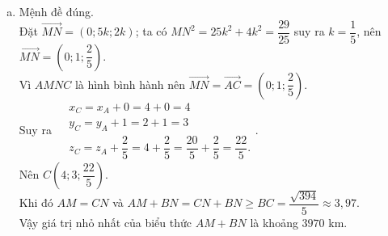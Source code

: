 \begin{ex}
{\begin{enumerate}[a)]
			Gọi $M$, $N$ là điểm đầu và điểm cuối của sao chổi trong vùng thượng quyển loãng  của sao Thủy.\\
			Ta có $IH=\dfrac{\sqrt{871}}{10}$, suy ra $MN=2MH=2\sqrt{R^2-IH^2}=2\sqrt{9-\dfrac{871}{100}}=\dfrac{\sqrt{29}}{5}$ (nghìn  km).\\
			Thời gian sao chổi di chuyển trong vùng thượng  quyển loãng
			\\$\dfrac{\sqrt{29}}{5} \times 1000\div51{,}5\approx 21$  (giây).
			 \item Mệnh đề đúng.\\
			Đặt $\overrightarrow{MN}=(0; 5k; 2k)$; ta có $MN^2=25k^2+4k^2=\dfrac{29}{25}$ suy ra $k=\dfrac{1}{5}$, nên  $\overrightarrow{MN}=\left(0;1;\dfrac{2}{5} \right)$.\\
			Vì $AMNC$ là hình bình hành nên $\overrightarrow{MN}=\overrightarrow{AC}=\left(0;1;\dfrac{2}{5}  \right)$. \\
			Suy ra $\begin{aligned}
			&  x_C=x_A+0=4+0=4 \\
			&  y_C=y_A+1=2+1=3 \\
			& z_C=z_A+\dfrac{2}{5}=4+\dfrac{2}{5}=\dfrac{20}{5}+\dfrac{2}{5}=\dfrac{22}{5}. 
		\end{aligned}$.\\
		Nên $C\left(4; 3;  \dfrac{22}{5}\right)$.\\
		Khi  đó $AM=CN$ và $AM+BN=CN+BN\ge BC=\dfrac{\sqrt{394}}{5} \approx 3{,}97$.\\
		Vậy  giá trị nhỏ nhất của biểu thức $AM+BN$ là khoảng $3970$ km.
	\end{enumerate}
 }
\end{ex}

